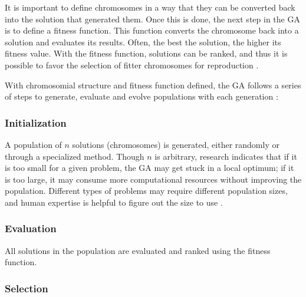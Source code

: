 It is important to define chromosomes in a way that they can be converted back into the solution that generated them. Once this is done, the next step in the GA is to define a fitness function. This function converts the chromosome back into a solution and evaluates its results. Often, the best the solution, the higher its fitness value. With the fitness function, solutions can be ranked, and thus it is possible to favor the selection of fitter chromosomes for reproduction \cite{KATOCH2021,SASTRY2005}.

With chromosomial structure and fitness function defined, the GA follows a series of steps to generate, evaluate and evolve populations with each generation \cite{SASTRY2005}:

\subsubsection*{Initialization}

    A population of $n$ solutions (chromosomes) is generated, either randomly or through a specialized method. Though $n$ is arbitrary, research indicates that if it is too small for a given problem, the GA may get stuck in a local optimum; if it is too large, it may consume more computational resources without improving the population. Different types of problems may require different population sizes, and human expertise is helpful to figure out the size to use \cite{ROEVA2013}.

 \subsubsection*{Evaluation}
 
    All solutions in the population are evaluated and ranked using the fitness function.
    
\subsubsection*{Selection}
    
